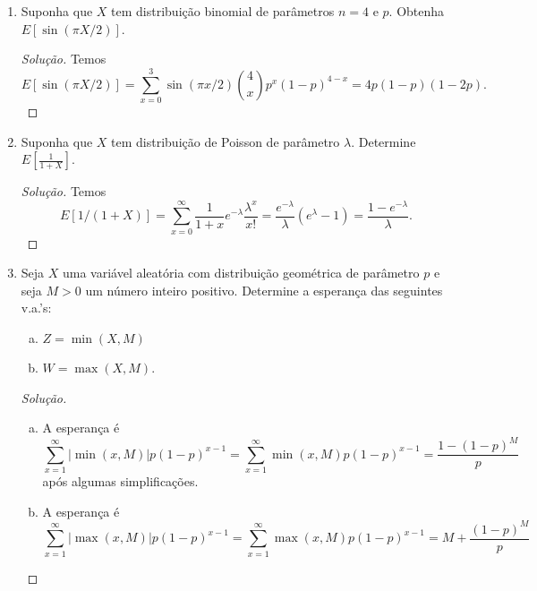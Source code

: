 \documentclass[../Notas.tex]{subfiles}
\begin{document}
\begin{enumerate}
    \begin{proof}[Solução]
        Temos
        \[
        EX = \sum_{x=1}^N \frac{x}{N} = \frac{N+1}{2}
        \]
        e
        \[
        EX^2 = \sum_{x=1}^N \frac{x^2}{N} = \frac{(N+1)(2N+1)}{6}.
        \]
    \end{proof}
    \item Suponha que $X$ tem distribuição binomial de parâmetros $n = 4$ e $p$. Obtenha $E[\sin(\pi X/2)]$.
    \begin{proof}[Solução]
        Temos
        \[
        E[\sin(\pi X/2)] = \sum_{x=0}^3 \sin(\pi x/2)\binom{4}{x}p^x(1-p)^{4-x}
                         = 4p(1-p)(1-2p).
        \]
    \end{proof}
    \item Suponha que $X$ tem distribuição de Poisson de parâmetro $\lambda$. Determine $\displaystyle{E[\frac{1}{1+X}]}$.
    \begin{proof}[Solução]
        Temos
        \[
        E[1/(1+X)] = \sum_{x=0}^{\infty} \frac{1}{1+x}e^{-\lambda}\frac{\lambda^x}{x!}
                   = \frac{e^{-\lambda}}{\lambda}(e^{\lambda} - 1)
                   = \frac{1 - e^{-\lambda}}{\lambda}.
        \]
    \end{proof}
    \item Seja $X$ uma variável aleatória com distribuição geométrica de parâmetro $p$ e seja $M > 0$ um número inteiro positivo. Determine a esperança das seguintes v.a.’s:
    \begin{enumerate}[a)]
    \item $Z = \min(X, M)$
    \item $W = \max(X, M)$.
    \end{enumerate}
    \begin{proof}[Solução]
        \begin{enumerate}[a)]
            \item A esperança é
            \[
            \sum_{x=1}^{\infty} |\min(x,M)|p(1-p)^{x-1} 
            = \sum_{x=1}^{\infty} \min(x,M)p(1-p)^{x-1}
            = \frac{1 - (1-p)^M}{p}
            \]
            após algumas simplificações.
            \item A esperança é
            \[
            \sum_{x=1}^{\infty} |\max(x,M)|p(1-p)^{x-1} 
            = \sum_{x=1}^{\infty} \max(x,M)p(1-p)^{x-1}
            = M + \frac{(1-p)^M}{p}
            \]

\end{enumerate}
\end{proof}
\end{enumerate}
\end{document}
